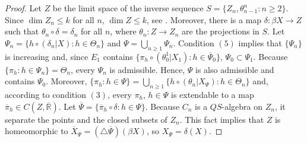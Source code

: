 \documentclass[12pt]{amsart}
\begin{document}
\begin{proof}
Let $Z$ be the limit space of the inverse sequence $S=\{Z_n,\theta^n_{n-1}:n\geq 2\}$. Since  $\dim Z_n\leq k$ for all $n$, $\dim Z\leq k$, see \cite[Theorem 3.4.11]{en}. Moreover, there is a map $\delta:\beta X\to Z$ such that $\theta_n\circ\delta=\delta_n$ for all $n$, where $\theta_n:Z\to Z_n$ are the projections in $S$. Let $\Psi_n=\{h\circ(\delta_n|X):h\in\Theta_n\}$ and $\Psi=\bigcup_{n\geq 1}\Psi_n$. Condition $(5)$ implies that $\{\Psi_n\}$ is increasing and, since $E_1$ contains $\{\pi_h\circ(\theta^1_0|X_1):h\in\overline\Psi_0\}$, $\Psi_0\subset\Psi_1$. Because $\{\pi_h:h\in\Psi_n\}=\Theta_n$, every $\Psi_n$ is admissible. Hence, $\Psi$ is also admissible and contains $\Psi_0$. Moreover, $\{\pi_h:h\in\Psi\}=\bigcup_{n\geq 1}\{h\circ(\theta_n|X_\Psi):h\in\Theta_n\}$ and, according to condition $(3)$, every $\pi_h$, $h\in\Psi$ is extendable to a map $\overline\pi_h\in C(Z,\overline{\mathbb R})$. Let $\overline\Psi=\{\overline\pi_h\circ\delta: h\in\Psi\}$. Because $C_n$ is a $QS$-algebra on $Z_n$, it separate the points and the closed subsets of $Z_n$. This fact implies that $Z$ is homeomorphic to $\overline X_\Psi=(\triangle\overline\Psi)(\beta X)$, so $X_\Psi=\delta(X)$.
  

\end{proof}
\end{document}
